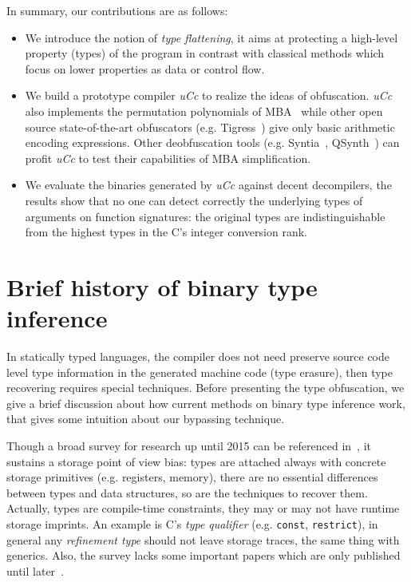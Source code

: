 \documentclass[compsoc,conference,a4paper,10pt,times]{IEEEtran}
\begin{document}
In summary, our contributions are as follows:
\begin{itemize}
  \item We introduce the notion of \emph{type flattening}, it aims at protecting a high-level
  property (types) of the program in contrast with classical methods which focus on lower
  properties as data or control flow.

  \item We build a prototype compiler \emph{uCc} to realize the ideas of obfuscation.
  \emph{uCc} also implements the permutation polynomials
  of MBA~\cite{zhou_information_2007} while other open source state-of-the-art obfuscators
  (e.g. Tigress~\cite{noauthor_tigress_nodate}) give only basic arithmetic encoding expressions.
  Other deobfuscation tools (e.g. Syntia~\cite{blazytko_syntia_2017}, QSynth~\cite{david_qsynth_2020})
  can profit \emph{uCc} to test their capabilities of MBA simplification.

  \item We evaluate the binaries generated by \emph{uCc} against decent decompilers, the results
  show that no one can detect correctly the underlying types of arguments on function signatures: the
  original types are indistinguishable from the highest types in the C's integer conversion rank.
\end{itemize}

\section{Brief history of binary type inference}
\noindent
In statically typed languages, the compiler does not need preserve source code level type information in
the generated machine code (type erasure), then type recovering requires special techniques. Before
presenting the type obfuscation, we give a brief discussion about how current methods on binary type
inference work, that gives some intuition about our bypassing technique.

Though a broad survey for research
up until 2015 can be referenced in~\cite{caballero_type_2016}, it sustains a storage point of view bias: types are attached
always with concrete storage primitives (e.g. registers, memory), there are no essential differences between types and
data structures, so are the techniques to recover them. Actually, types are compile-time constraints, they
may or may not have runtime storage imprints. An example is C's \emph{type qualifier} (e.g.
\texttt{const}, \texttt{restrict}), in general any
\emph{refinement type} should not leave storage traces, the same thing with generics.
Also, the survey lacks some important
papers which are only published until later~\cite{noonan_polymorphic_2016,robbins_minx_2016}.
\end{document}
